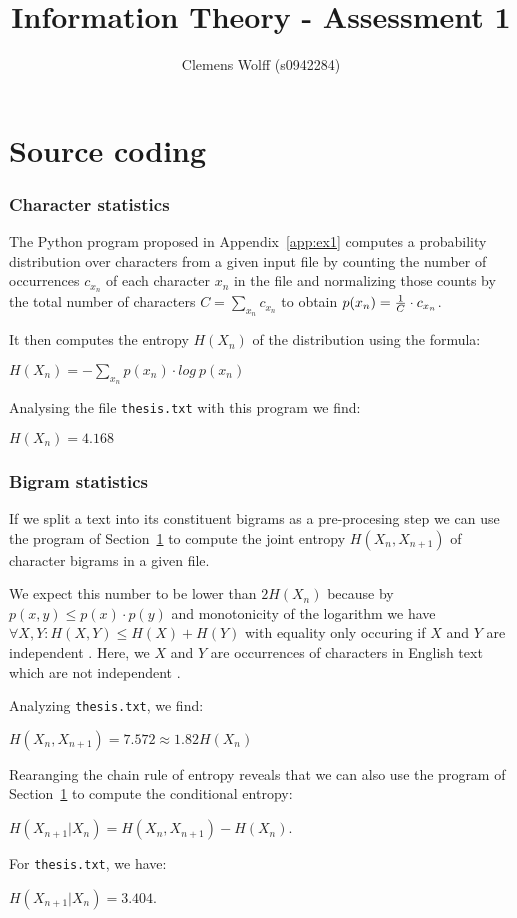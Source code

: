 \documentclass[10pt,a4paper,twoside,twocolumn]{article}
\title{Information Theory - Assessment 1}
\author{Clemens Wolff (s0942284)}
\date{\vspace{-2em}}
\newcommand*{\thesisTXT}{{\tt thesis.txt}\xspace}
\begin{document}
\maketitle


\part{Source coding}

\section{Character statistics}\label{sec:ex1}
The Python program proposed in Appendix~\ref{app:ex1} computes a probability
distribution over characters from a given input file by counting the number of
occurrences $c_{x_n}$ of each character $x_n$ in the file and normalizing those
counts by the total number of characters $C = \sum\limits_{x_n} c_{x_n}$ to
obtain $p(x_n) = {1 \over C} \cdot c_{x_n}$.

It then computes the entropy $H(X_n)$ of the distribution using the formula:
\begin{center}
    $H(X_n) = -\sum\limits_{x_n} p(x_n) \cdot log~p(x_n)$
\end{center}
Analysing the file \thesisTXT with this program we find:
\begin{center}
    $H(X_n) = 4.168$
\end{center}

\section{Bigram statistics}\label{sec:ex2}
If we split a text into its constituent bigrams as a pre-procesing step we can
use the program of Section~\ref{sec:ex1} to compute the joint entropy $H(X_n,
X_{n+1})$ of character bigrams in a given file.

We expect this number to be lower than $2H(X_n)$ because by $p(x,y) \le
p(x) \cdot p(y)$ and monotonicity of the logarithm we have $\forall X,Y: H(X, Y)
\le H(X) + H(Y)$ with equality only occuring if $X$ and $Y$ are independent
\cite[p.~138]{mackay}. Here, we $X$ and $Y$ are occurrences of characters in
English text which are not independent \cite[p.~22-24]{mackay}.

Analyzing \thesisTXT, we find:
\begin{center}
    $H(X_n, X_{n+1}) = 7.572 \approx 1.82H(X_n)$
\end{center}

Rearanging the chain rule of entropy \cite[p.~139]{mackay} reveals that we can
also use the program of Section~\ref{sec:ex1} to compute the conditional
entropy:
\begin{center}
    $H(X_{n+1} | X_n) = H(X_n, X_{n+1}) - H(X_n)$.
\end{center}
For \thesisTXT, we have:
\begin{center}
    $H(X_{n+1} | X_n) = 3.404$.
\end{center}
\end{document}
